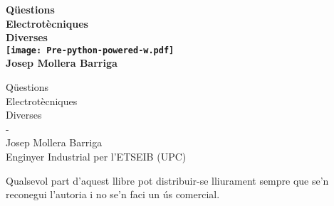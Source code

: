 
\BgThispage
      
\begin{titlepage}
	\parbox{18cm}{\fontsize{60pt}{60pt}\sffamily\bfseries\selectfont\color{red}%
		Qüestions\\[25pt] Electrotècniques\\[25pt] Diverses\\
		\hspace*{9.5cm}\texttt{[image: Pre-python-powered-w.pdf]}\\
		\fontsize{30pt}{30pt}\sffamily\mdseries\selectfont{}Josep Mollera Barriga}
	\vspace*{10mm}
	\begin{center}
		\fontsize{10pt}{11pt}\normalfont\selectfont
		
	\end{center}
\end{titlepage}

\cleardoublepage\thispagestyle{empty}
{\fontsize{60pt}{60pt}\selectfont%
	Qüestions\\[25pt]
	Electrotècniques\\[25pt]
	Diverses\\[90pt]}
{\fontsize{40pt}{40pt}-\the\year \hspace{5mm}{\Huge(versió 14.5)}\\[85pt]
	Josep Mollera Barriga\\[25pt]}
{\fontsize{25pt}{25pt}\selectfont
	Enginyer Industrial per l'ETSEIB (UPC)}
\vfill
{\fontsize{15pt}{20pt}\selectfont
	\begin{list}{}
		{\setlength{\labelwidth}{7mm} \setlength{\leftmargin}{7mm}\setlength{\labelsep}{2mm}}
		\item[{\faCopyright[regular]}]  Qualsevol part d'aquest llibre  pot  distribuir-se lliurament
		sempre que se’n reconegui l’autoria i no se’n faci un ús comercial.
\end{list}}

